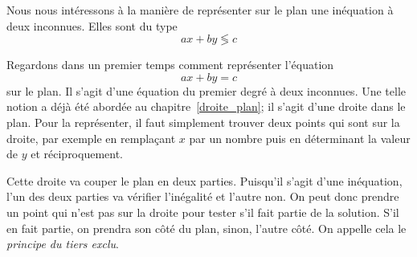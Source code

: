 Nous nous intéressons à la manière de représenter sur le plan une inéquation à deux inconnues. Elles sont du type
$$
ax+by \lessgtr c
$$

Regardons dans un premier temps comment représenter l'équation
$$
ax+by=c
$$
sur le plan. Il s'agit d'une équation du premier degré à deux inconnues. Une telle notion a déjà été abordée au chapitre~\ref{droite_plan}; il s'agit d'une droite dans le plan. Pour la représenter, il faut simplement trouver deux points qui sont sur la droite, par exemple en remplaçant $x$ par un nombre puis en déterminant la valeur de $y$ et réciproquement.

Cette droite va couper le plan en deux parties. Puisqu'il s'agit d'une inéquation, l'un des deux parties va vérifier l'inégalité et l'autre non. On peut donc prendre un point qui n'est pas sur la droite pour tester s'il fait partie de la solution. S'il en fait partie, on prendra son côté du plan, sinon, l'autre côté. On appelle cela le \emph{principe du tiers exclu}.

